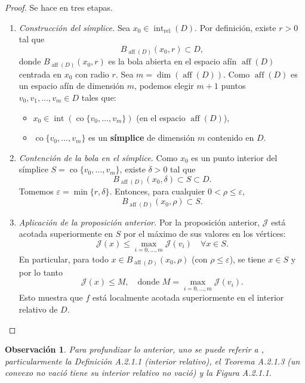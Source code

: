 \documentclass[12pt]{book}
\newtheorem{remark}{Observación}
\theoremstyle{definition}
\theoremstyle{plain}
\theoremstyle{remark}
\begin{document}
\begin{proof} Se hace en tres etapas.
\begin{enumerate}
    \item \emph{Construcción del símplice.}
    Sea $x_0 \in \operatorname{int}_{\operatorname{rel}}(D)$. Por definición, existe $r > 0$ tal que
    \[
    B_{\operatorname{aff}(D)}(x_0, r) \subset D,
    \]
    donde $B_{\operatorname{aff}(D)}(x_0, r)$ es la bola abierta en el espacio afín $\operatorname{aff}(D)$ centrada en $x_0$ con radio $r$.
    Sea $m = \dim(\operatorname{aff}(D))$. Como $\operatorname{aff}(D)$ es un espacio afín de dimensión $m$, podemos elegir $m+1$ puntos $v_0, v_1, \dots, v_m \in D$ tales que:
    \begin{itemize}
        \item $x_0 \in \operatorname{int}(\operatorname{co}\{v_0, \dots, v_m\})$ (en el espacio $\operatorname{aff}(D)$),
        \item $\operatorname{co}\{v_0, \dots, v_m\}$ es un \textbf{símplice} de dimensión $m$ contenido en $D$.
    \end{itemize}

    \item \emph{Contención de la bola en el símplice.}
    Como $x_0$ es un punto interior del símplice $S = \operatorname{co}\{v_0, \dots, v_m\}$, existe $\delta > 0$ tal que
    \[
    B_{\operatorname{aff}(D)}(x_0, \delta) \subset S \subset D.
    \]
    Tomemos $\varepsilon = \min\{r, \delta\}$. Entonces, para cualquier $0 < \rho \leq \varepsilon$,
    \[
    B_{\operatorname{aff}(D)}(x_0, \rho) \subset S.\]

    \item \emph{Aplicación de la proposición anterior.}
    Por la proposición anterior, $\mathcal{J}$ está acotada superiormente en $S$ por el máximo de sus valores en los vértices:
    \[
    \mathcal{J}(x) \leq \max_{i=0,\dots,m} \mathcal{J}(v_i) \quad \forall x \in S.
    \]
    En particular, para todo $x \in B_{\operatorname{aff}(D)}(x_0, \rho)$ (con $\rho \leq \varepsilon$), se tiene $x \in S$ y por lo tanto
    \[
    \mathcal{J}(x) \leq M, \quad \text{donde } M = \max_{i=0,\dots,m} \mathcal{J}(v_i).
    \]
    Esto muestra que $f$ está {localmente acotada superiormente} en el interior relativo de $D$. \qedhere
\end{enumerate}
\end{proof}

\begin{remark} Para profundizar lo anterior, uno se puede referir a
\cite[Pagina 34]{hiriart2001}, particularmente la Definición A.2.1.1 (interior relativo), el Teorema A.2.1.3 (un convexo no vació tiene su interior relativo no vació) y la Figura A.2.1.1.
\end{remark}
\end{document}
